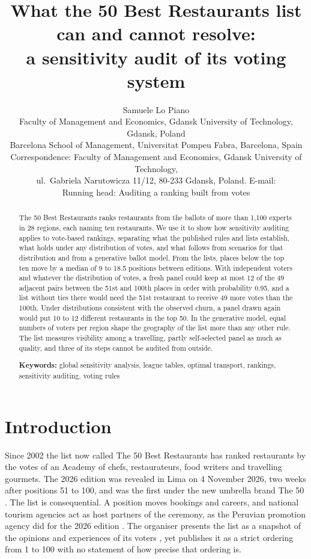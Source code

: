 \documentclass[11pt,a4paper]{article}
\title{What the 50 Best Restaurants list can and cannot resolve:\\a sensitivity audit of its voting system}
\author{Samuele Lo Piano\\[2pt]
\small Faculty of Management and Economics, Gdansk University of Technology, Gdansk, Poland\\
\small Barcelona School of Management, Universitat Pompeu Fabra, Barcelona, Spain\\[6pt]
\small Correspondence: Faculty of Management and Economics, Gdansk University of Technology,\\
\small ul.\ Gabriela Narutowicza 11/12, 80-233 Gdansk, Poland\ifx\corremail\empty\else. E-mail: \corremail\fi\\[4pt]
\small Running head: Auditing a ranking built from votes}
\date{}
\begin{document}
\maketitle

\begin{abstract}
\noindent The 50 Best Restaurants ranks restaurants from the ballots of more than 1,100 experts in 28 regions, each naming ten restaurants. We use it to show how sensitivity auditing applies to vote-based rankings, separating what the published rules and lists establish, what holds under any distribution of votes, and what follows from scenarios for that distribution and from a generative ballot model. From the lists, places below the top ten move by a median of 9 to 18.5 positions between editions. With independent voters and whatever the distribution of votes, a fresh panel could keep at most 12 of the 49 adjacent pairs between the 51st and 100th places in order with probability 0.95, and a list without ties there would need the 51st restaurant to receive 49 more votes than the 100th. Under distributions consistent with the observed churn, a panel drawn again would put 10 to 12 different restaurants in the top 50. In the generative model, equal numbers of voters per region shape the geography of the list more than any other rule. The list measures visibility among a travelling, partly self-selected panel as much as quality, and three of its steps cannot be audited from outside.

\medskip\noindent\textbf{Keywords:} global sensitivity analysis, league tables, optimal transport, rankings, sensitivity auditing, voting rules
\end{abstract}

\section{Introduction}

Since 2002 the list now called The 50 Best Restaurants has ranked restaurants by the votes of an Academy of chefs, restaurateurs, food writers and travelling gourmets. The 2026 edition was revealed in Lima on 4 November 2026, two weeks after positions 51 to 100, and was the first under the new umbrella brand The 50 \citep{the50list2026,rebrand2026}. The list is consequential. A position moves bookings and careers, and national tourism agencies act as host partners of the ceremony, as the Peruvian promotion agency did for the 2026 edition \citep{the50partners2026,lima2026host}. The organiser presents the list as a snapshot of the opinions and experiences of its voters \citep{w50bvoting2026old}, yet publishes it as a strict ordering from 1 to 100 with no statement of how precise that ordering is.
\end{document}

